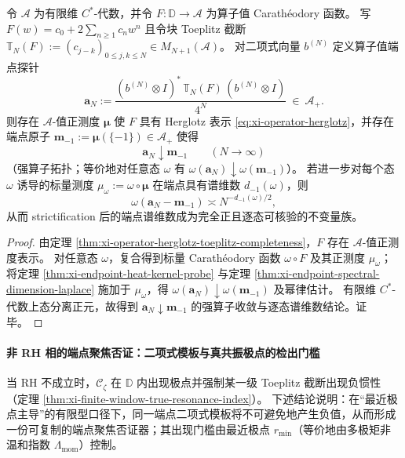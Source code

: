 \begin{theorem}[算子值端点原子与谱维数]\label{thm:xi-operator-endpoint-heat-kernel-dimension}
令 \(\mathcal{A}\) 为有限维 \(C^\ast\)-代数，并令 \(F:\mathbb{D}\to\mathcal{A}\) 为算子值 Carath\'eodory 函数。
写 \(F(w)=c_0+2\sum_{n\ge 1}c_n w^n\) 且令块 Toeplitz 截断
\(
\mathbb{T}_N(F):=(c_{j-k})_{0\le j,k\le N}\in M_{N+1}(\mathcal{A})
\)。
对二项式向量 \(b^{(N)}\) 定义算子值端点探针
\[
\boxed{\;
\mathbf{a}_N
:=\frac{(b^{(N)}\otimes I)^\ast\,\mathbb{T}_N(F)\,(b^{(N)}\otimes I)}{4^N}\ \in\ \mathcal{A}_+.\;}
\]
则存在 \(\mathcal{A}\)-值正测度 \(\boldsymbol\mu\) 使 \(F\) 具有 Herglotz 表示 \eqref{eq:xi-operator-herglotz}，并存在端点原子
\(\mathbf{m}_{-1}:=\boldsymbol\mu(\{-1\})\in\mathcal{A}_+\) 使得
\[
\boxed{\;
\mathbf{a}_N\downarrow \mathbf{m}_{-1}\qquad(N\to\infty)\;}
\]
（强算子拓扑；等价地对任意态 \(\omega\) 有 \(\omega(\mathbf{a}_N)\downarrow \omega(\mathbf{m}_{-1})\)）。
若进一步对每个态 \(\omega\) 诱导的标量测度 \(\mu_{\omega}:=\omega\circ\boldsymbol\mu\) 在端点具有谱维数 \(d_{-1}(\omega)\)，则
\[
\omega(\mathbf{a}_N-\mathbf{m}_{-1})\asymp N^{-d_{-1}(\omega)/2},
\]
从而 strictification 后的端点谱维数成为完全正且逐态可核验的不变量族。
\end{theorem}

\begin{proof}
由定理 \ref{thm:xi-operator-herglotz-toeplitz-completeness}，\(F\) 存在 \(\mathcal{A}\)-值正测度表示。
对任意态 \(\omega\)，复合得到标量 Carath\'eodory 函数 \(\omega\circ F\) 及其正测度 \(\mu_{\omega}\)；
将定理 \ref{thm:xi-endpoint-heat-kernel-probe} 与定理 \ref{thm:xi-endpoint-spectral-dimension-laplace} 施加于 \(\mu_{\omega}\)，得 \(\omega(\mathbf{a}_N)\downarrow \omega(\mathbf{m}_{-1})\) 及幂律估计。
有限维 \(C^\ast\)-代数上态分离正元，故得到 \(\mathbf{a}_N\downarrow \mathbf{m}_{-1}\) 的强算子收敛与逐态谱维数结论。证毕。
\end{proof}

\paragraph{非 RH 相的端点聚焦否证：二项式模板与真共振极点的检出门槛}
当 RH 不成立时，\(\mathscr{C}_{\zeta}\) 在 \(\mathbb{D}\) 内出现极点并强制某一级 Toeplitz 截断出现负惯性（定理 \ref{thm:xi-finite-window-true-resonance-index}）。
下述结论说明：在“最近极点主导”的有限型口径下，同一端点二项式模板将不可避免地产生负值，从而形成一份可复制的端点聚焦否证器；其出现门槛由最近极点 \(r_{\min}\)（等价地由多极矩非温和指数 \(\Lambda_{\mathrm{mom}}\)）控制。

